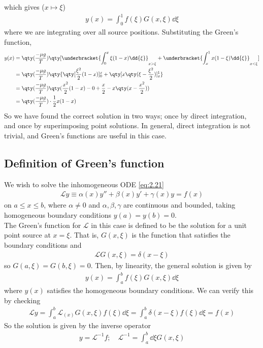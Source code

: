 which gives ($x \mapsto \xi$)
\begin{align} \label{eq:7.5}
	y(x) = \int_0^1 f(\xi) G(x,\xi) \dd{\xi}
\end{align}
where we are integrating over all source positions.
Substituting the Green's function,
\begin{align*}
	y(x) & = \qty(\frac{-\mu g}{T}) \qty[ \underbracket{\int_0^x \xi(1-x) \dd{\xi}}_{x > \xi} + \underbracket{\int_x^1 x(1-\xi) \dd{\xi}}_{x < \xi}] \\
    &= \qty(\frac{-\mu g}{T}) \qty{ \qty[\frac{\xi^2}{2}(1-x)]_0^x + \qty[x \qty(\xi - \frac{\xi^2}{2})]_x^1 } \\
    &= \qty(\frac{-\mu g}{T}) \qty(\frac{x^2}{2}(1-x) - 0 + \frac{x}{2} - x\qty(x-\frac{x^2}{2}))  \\
    &= \qty(\frac{-\mu g}{T}) \cdot \frac{1}{2}x(1-x)
\end{align*}
So we have found the correct solution in two ways; once by direct integration, and once by superimposing point solutions.
In general, direct integration is not trivial, and Green's functions are useful in this case.

\subsection{Definition of Green's function}
We wish to solve the inhomogeneous ODE \cref{eq:2.21}
\begin{align} \label{eq:7.6}
	\mathcal L y \equiv \alpha(x) y'' + \beta(x) y' + \gamma(x) y = f(x)
\end{align}
on $a \leq x \leq b$, where $\alpha \neq 0$ and $\alpha, \beta, \gamma$ are continuous and bounded, taking homogeneous boundary conditions $y(a) = y(b) = 0$. \\
The Green's function for $\mathcal L$ in this case is defined to be the solution for a unit point source at $x = \xi$.
That is, $G(x,\xi)$ is the function that satisfies the boundary conditions and
\begin{align} \label{eq:7.7}
	\mathcal L G(x,\xi) = \delta(x-\xi)
\end{align}
so $G(a,\xi) = G(b,\xi) = 0$.
Then, by linearity, the general solution is given by
\begin{align} \label{eq:7.8}
	y(x) = \int_a^b f(\xi) G(x,\xi) \dd{\xi}
\end{align}
where $y(x)$ satisfies the homogeneous boundary conditions.
We can verify this by checking
\begin{align*}
	\mathcal L y = \int_a^b \mathcal L_{(x)} G(x,\xi) f(\xi) \dd{\xi} = \int_a^b \delta(x-\xi) f(\xi) \dd{\xi} = f(x)
\end{align*}
So the solution is given by the inverse operator
\begin{align*}
	y = \mathcal L^{-1} f;\quad \mathcal L^{-1} = \int_a^b \dd{\xi} G(x,\xi)
\end{align*}

